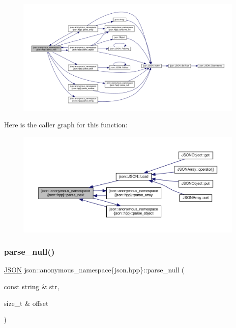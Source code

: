 \begin{figure}[H]
\begin{center}
\leavevmode
\includegraphics[width=350pt]{namespacejson_1_1anonymous__namespace_02json_8hpp_03_acd55b945d1583038db8633516df7cf3f_cgraph}
\end{center}
\end{figure}
Here is the caller graph for this function\+:
\nopagebreak
\begin{figure}[H]
\begin{center}
\leavevmode
\includegraphics[width=350pt]{namespacejson_1_1anonymous__namespace_02json_8hpp_03_acd55b945d1583038db8633516df7cf3f_icgraph}
\end{center}
\end{figure}
\mbox{\label{namespacejson_1_1anonymous__namespace_02json_8hpp_03_ad65e6ea0d2d880b099cf399600bf5666}} 
\subsubsection{\texorpdfstring{parse\+\_\+null()}{parse\_null()}}
{\footnotesize\ttfamily \mbox{\hyperlink{classjson_1_1_j_s_o_n}{J\+S\+ON}} json\+::anonymous\+\_\+namespace\{json.\+hpp\}\+::parse\+\_\+null (\begin{DoxyParamCaption}\item[{const string \&}]{str,  }\item[{size\+\_\+t \&}]{offset }\end{DoxyParamCaption})}




